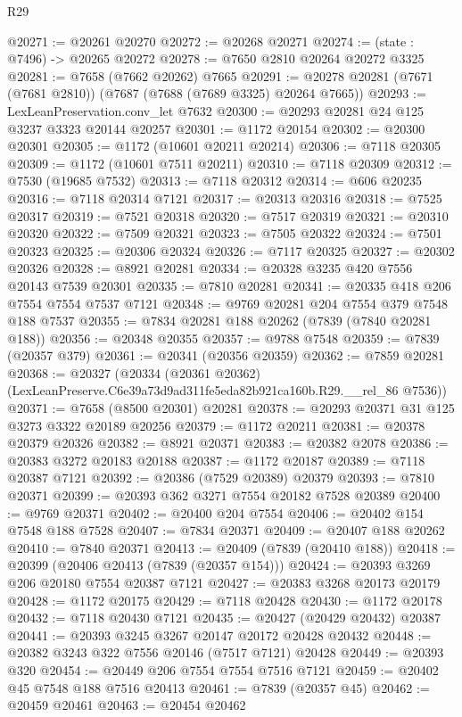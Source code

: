 \begin{lexlean}{R29}
\begin{coremodule}
@20271 := @20261 @20270
@20272 := @20268 @20271
@20274 := (state : @7496) -> @20265 @20272
@20278 := @7650 @2810 @20264 @20272 @3325
@20281 := @7658 (@7662 @20262) @7665
@20291 := @20278 @20281 (@7671 (@7681 @2810)) (@7687 (@7688 (@7689 @3325) @20264 @7665))
@20293 := LexLeanPreservation.conv_let @7632
@20300 := @20293 @20281 @24 @125 @3237 @3323 @20144 @20257
@20301 := @1172 @20154
@20302 := @20300 @20301
@20305 := @1172 (@10601 @20211 @20214)
@20306 := @7118 @20305
@20309 := @1172 (@10601 @7511 @20211)
@20310 := @7118 @20309
@20312 := @7530 (@19685 @7532)
@20313 := @7118 @20312
@20314 := @606 @20235
@20316 := @7118 @20314 @7121
@20317 := @20313 @20316
@20318 := @7525 @20317
@20319 := @7521 @20318
@20320 := @7517 @20319
@20321 := @20310 @20320
@20322 := @7509 @20321
@20323 := @7505 @20322
@20324 := @7501 @20323
@20325 := @20306 @20324
@20326 := @7117 @20325
@20327 := @20302 @20326
@20328 := @8921 @20281
@20334 := @20328 @3235 @420 @7556 @20143 @7539 @20301
@20335 := @7810 @20281
@20341 := @20335 @418 @206 @7554 @7554 @7537 @7121
@20348 := @9769 @20281 @204 @7554 @379 @7548 @188 @7537
@20355 := @7834 @20281 @188 @20262 (@7839 (@7840 @20281 @188))
@20356 := @20348 @20355
@20357 := @9788 @7548
@20359 := @7839 (@20357 @379)
@20361 := @20341 (@20356 @20359)
@20362 := @7859 @20281
@20368 := @20327
    (@20334 (@20361 @20362) (LexLeanPreserve.C6e39a73d9ad311fe5eda82b921ca160b.R29.__rel_86 @7536))
@20371 := @7658 (@8500 @20301) @20281
@20378 := @20293 @20371 @31 @125 @3273 @3322 @20189 @20256
@20379 := @1172 @20211
@20381 := @20378 @20379 @20326
@20382 := @8921 @20371
@20383 := @20382 @2078
@20386 := @20383 @3272 @20183 @20188
@20387 := @1172 @20187
@20389 := @7118 @20387 @7121
@20392 := @20386 (@7529 @20389) @20379
@20393 := @7810 @20371
@20399 := @20393 @362 @3271 @7554 @20182 @7528 @20389
@20400 := @9769 @20371
@20402 := @20400 @204 @7554
@20406 := @20402 @154 @7548 @188 @7528
@20407 := @7834 @20371
@20409 := @20407 @188 @20262
@20410 := @7840 @20371
@20413 := @20409 (@7839 (@20410 @188))
@20418 := @20399 (@20406 @20413 (@7839 (@20357 @154)))
@20424 := @20393 @3269 @206 @20180 @7554 @20387 @7121
@20427 := @20383 @3268 @20173 @20179
@20428 := @1172 @20175
@20429 := @7118 @20428
@20430 := @1172 @20178
@20432 := @7118 @20430 @7121
@20435 := @20427 (@20429 @20432) @20387
@20441 := @20393 @3245 @3267 @20147 @20172 @20428 @20432
@20448 := @20382 @3243 @322 @7556 @20146 (@7517 @7121) @20428
@20449 := @20393 @320
@20454 := @20449 @206 @7554 @7554 @7516 @7121
@20459 := @20402 @45 @7548 @188 @7516 @20413
@20461 := @7839 (@20357 @45)
@20462 := @20459 @20461
@20463 := @20454 @20462

\end{coremodule}
\end{lexlean}
